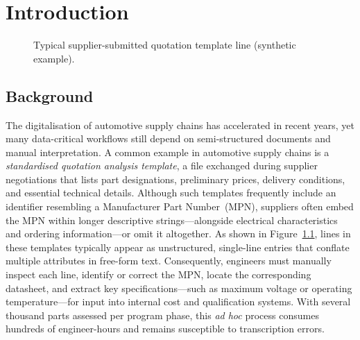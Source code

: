 \chapter{Introduction}\label{chapter:introduction}

\begin{figure}[H]
  \centering
  \caption{Typical supplier-submitted quotation template line (synthetic example).}
  \label{fig:qaf-line-example}
\end{figure}

\section{Background }
The digitalisation of automotive supply chains has accelerated in recent years, yet many data-critical workflows still depend on semi-structured documents and manual interpretation.  
A common example in automotive supply chains is a \emph{standardised quotation analysis template}, a file exchanged during supplier negotiations that lists part designations, preliminary prices, delivery conditions, and essential technical details.  
Although such templates frequently include an identifier resembling a Manufacturer Part Number~(MPN), suppliers often embed the MPN within longer descriptive strings—alongside electrical characteristics and ordering information—or omit it altogether.  
As shown in Figure~\ref{fig:qaf-line-example}, lines in these templates typically appear as unstructured, single-line entries that conflate multiple attributes in free-form text.  
Consequently, engineers must manually inspect each line, identify or correct the MPN, locate the corresponding datasheet, and extract key specifications—such as maximum voltage or operating temperature—for input into internal cost and qualification systems.  
With several thousand parts assessed per program phase, this \emph{ad hoc} process consumes hundreds of engineer-hours and remains susceptible to transcription errors.


